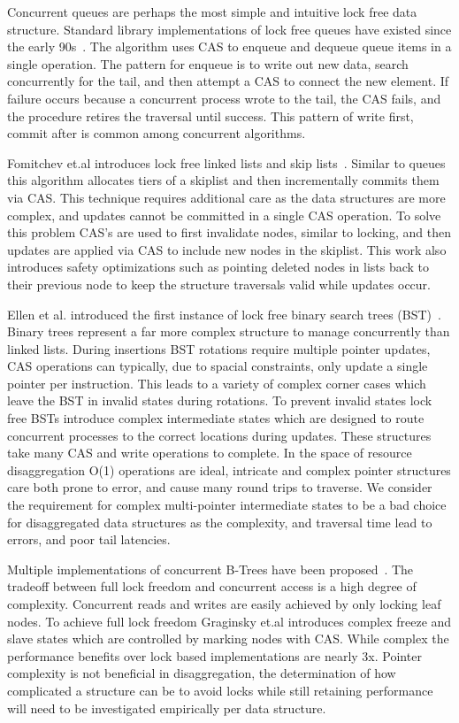 Concurrent queues are perhaps the most simple and intuitive lock free data
structure. Standard library implementations of lock free queues have existed
since the early 90s~\cite{simple-fast}. The algorithm uses CAS to enqueue and
dequeue queue items in a single operation. The pattern for enqueue is to write
out new data, search concurrently for the tail, and then attempt a CAS to
connect the new element. If failure occurs because a concurrent process wrote to
the tail, the CAS fails, and the procedure retires the traversal until success.
This pattern of write first, commit after is common among concurrent algorithms.

Fomitchev et.al introduces lock free linked lists and skip
lists~\cite{lock-free-skip}. Similar to queues this algorithm allocates tiers of
a skiplist and then incrementally commits them via CAS. This technique requires
additional care as the data structures are more complex, and updates cannot be
committed in a single CAS operation. To solve this problem CAS's are used to
first invalidate nodes, similar to locking, and then updates are applied via CAS
to include new nodes in the skiplist. This work also introduces safety
optimizations such as pointing deleted nodes in lists back to their previous
node to keep the structure traversals valid while updates occur.

Ellen et al. introduced the first instance of lock free binary search trees
(BST)~\cite{non-block-binary}.  Binary trees represent a far more complex
structure to manage concurrently than linked lists. During insertions BST
rotations require multiple pointer updates, CAS operations can typically, due to
spacial constraints, only update a single pointer per instruction. This leads to
a variety of complex corner cases which leave the BST in invalid states during
rotations.  To prevent invalid states lock free BSTs introduce complex
intermediate states which are designed to route concurrent processes to the
correct locations during updates. These structures take many CAS and write
operations to complete. In the space of resource disaggregation O(1) operations
are ideal, intricate and complex pointer structures care both prone to error,
and cause many round trips to traverse. We consider the requirement for complex
multi-pointer intermediate states to be a bad choice for disaggregated data
structures as the complexity, and traversal time lead to errors, and poor tail
latencies.
 
Multiple implementations of concurrent B-Trees have been
proposed~\cite{read-concur-btree,lock-free-btree}. The tradeoff between full
lock freedom and concurrent access is a high degree of complexity. Concurrent
reads and writes are easily achieved by only locking leaf nodes. To achieve full
lock freedom Graginsky et.al introduces complex freeze and slave states which
are controlled by marking nodes with CAS. While complex the performance benefits
over lock based implementations are nearly 3x. Pointer complexity is not
beneficial in disaggregation, the determination of how complicated a structure
can be to avoid locks while still retaining performance will need to be
investigated empirically per data structure.

